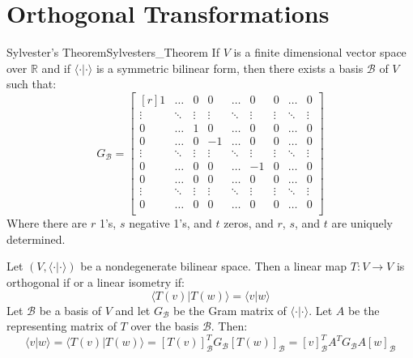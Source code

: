 \section{Orthogonal Transformations}
    \begin{ltheorem}{Sylvester's Theorem}{Sylvesters_Theorem}
        If $V$ is a finite dimensional vector space over $\mathbb{R}$ and if
        $\langle\cdot|\cdot\rangle$ is a symmetric bilinear form, then there
        exists a basis $\mathscr{B}$ of $V$ such that:
        \begin{equation}
            G_{\mathscr{B}}=
            \begin{bmatrix*}[r]
                1&\dots&0&0&\dots&0&0&\dots&0\\
                \vdots&\ddots&\vdots&\vdots&\ddots
                    &\vdots&\vdots&\ddots&\vdots\\
                0&\dots&1&0&\dots&0&0&\dots&0\\
                0&\dots&0&\minus{1}&\dots&0&0&\dots&0\\
                \vdots&\ddots&\vdots&\vdots
                    &\ddots&\vdots&\vdots&\ddots&\vdots\\
                0&\dots&0&0&\dots&\minus{1}&0&\dots&0\\
                0&\dots&0&0&\dots&0&0&\dots&0\\
                \vdots&\ddots&\vdots&\vdots&\ddots
                    &\vdots&\vdots&\ddots&\vdots\\
                0&\dots&0&0&\dots&0&0&\dots&0\\
            \end{bmatrix*}
        \end{equation}
        Where there are $r$ 1's, $s$ negative 1's, and $t$ zeros, and
        $r$, $s$, and $t$ are uniquely determined.
    \end{ltheorem}
    Let $(V,\langle\cdot|\cdot\rangle)$ be a nondegenerate bilinear space.
    Then a linear map $T:V\rightarrow{V}$ is orthogonal if or a linear
    isometry if:
    \begin{equation}
        \langle{T}(v)|T(w)\rangle=\langle{v}|w\rangle
    \end{equation}
    Let $\mathscr{B}$ be a basis of $V$ and let $G_{\mathscr{B}}$ be the
    Gram matrix of $\langle\cdot|\cdot\rangle$. Let $A$ be the representing
    matrix of $T$ over the basis $\mathscr{B}$. Then:
    \begin{equation}
        \langle{v}|w\rangle
        =\langle{T}(v)|T(w)\rangle
        =[T(v)]_{\mathscr{B}}^{T}G_{\mathscr{B}}[T(w)]_{\mathscr{B}}
        =[v]_{\mathscr{B}}^{T}A^{T}G_{\mathscr{B}}A[w]_{\mathscr{B}}
    \end{equation}
